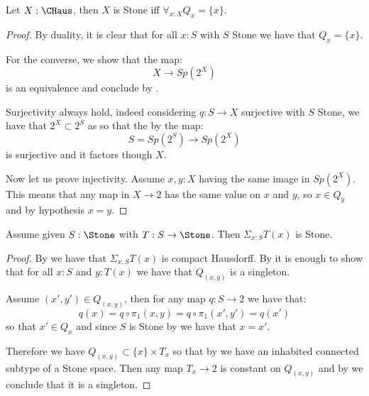 \begin{lemma}\label{StoneCompactHausdorffTotallyDisconnected}
Let $X:\CHaus$, then $X$ is Stone iff $\forall_{x:X}Q_x=\{x\}$.
\end{lemma}

\begin{proof}
By duality, it is clear that for all $x:S$ with $S$ Stone we have that $Q_x=\{x\}$.

For the converse, we show that the map:
\[X\to Sp(2^X)\]
is an equivalence and conclude by . 

Surjectivity always hold, indeed considering $q:S\to X$ surjective with $S$ Stone, we have that $2^X\subset 2^S$ as so that the by  the map:
$$S = Sp(2^S)\to Sp(2^X)$$
is surjective and it factors though $X$.

Now let us prove injectivity. Assume $x,y:X$ having the same image in $Sp(2^X)$. This means that any map in $X\to 2$ has the same value on $x$ and $y$, so $x\in Q_y$ and by hypothesis $x=y$.
\end{proof}

\begin{theorem}
Assume given $S:\Stone$ with $T:S\to\Stone$. Then $\Sigma_{x:S}T(x)$ is Stone.
\end{theorem}

\begin{proof}
By  we have that $\Sigma_{x:S}T(x)$ is compact Hausdorff. By  it is enough to show that for all $x:S$ and $y:T(x)$ we have that $Q_{(x,y)}$ is a singleton.

Assume $(x',y')\in Q_{(x,y)}$, then for any map $q:S\to 2$ we have that:
$$ q(x) = q\circ \pi_1(x,y) = q\circ \pi_1(x',y') = q(x')$$
so that $x'\in Q_x$ and since $S$ is Stone by  we have that $x=x'$.

Therefore we have $Q_{(x,y)}\subset \{x\}\times T_x$ so that by  we have an inhabited  connected subtype of a Stone space. Then any map $T_x\to 2$ is constant on $Q_{(x,y)}$ and by  we conclude that it is a singleton.
\end{proof}


